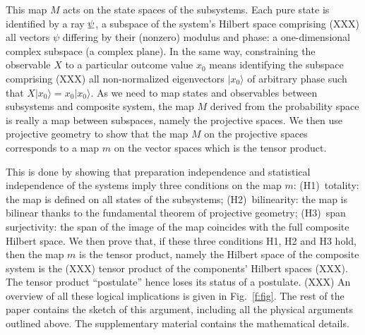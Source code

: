 \documentclass[aps,prl,amsmath,amssymb,twocolumn]{revtex4}
\theoremstyle{plain}
\theoremstyle{definition}
\theoremstyle{remark}
\newcommand{\pj}[1] {\underbar{$#1$}}
\def\>{\rangle}
\def\comment#1{}
\begin{document}
\comment{mettere nel supplementary: We will mainly focus on
  kine\-mati\-cal\-ly-inde\-pen\-dent systems, namely no
  superselection rules or other restrictions to the state space are
  present: it is possible to prepare each subsystem of a composite
  system in a state that is independent of the other systems
  (preparation independence).  This is the only case in which the
  tensor product can be properly employed: the Hilbert space of
  composite systems that have restrictions is {\em not} the tensor
  product of the component spaces, but a subspace of it (e.g.~the
  anti-symmetric subspace for fermions). Typically this is ignored in
  the literature, since the tensor product formalism is very
  convenient and is often used also in these cases, and superselection
  rules are typically avoidable \cite{susskind,zanardi,zanardilloyd}.
}
	
This map $M$ acts on the state spaces of the subsystems. Each pure
state is identified by a ray $\pj{\psi}$, a subspace of the system's
Hilbert space comprising (XXX) all vectors $\psi$ differing by their
(nonzero) modulus and phase: a one-dimensional complex subspace (a complex plane). In
the same way, constraining the observable $X$ to a particular outcome
value $x_0$ means identifying the subspace comprising (XXX) all
non-normalized eigenvectors $|x_0\>$ of arbitrary phase such that
$X | x_0 \> = x_0 |x_0\>$. As we need to map states and observables
between subsystems and composite system, the map $M$ derived from the
probability space is really a map between subspaces, namely the
projective spaces. We then use projective geometry to show that the
map $M$ on the projective spaces corresponds to a map $m$ on the
vector spaces which is the tensor product.

This is done by showing that preparation independence and statistical
independence of the systems imply three conditions on the map $m$:
(H1)~totality: the map is defined on all states of the subsystems;
(H2)~bilinearity: the map is bilinear thanks to the fundamental
theorem of projective geometry; (H3)~span surjectivity: the span of
the image of the map coincides with the full composite Hilbert space.  We
then prove that, if these three conditions H1, H2 and H3 hold, then
the map $m$ is the tensor product, namely the Hilbert space of the
composite system is the (XXX) tensor product of the components' Hilbert spaces (XXX). The tensor
product ``postulate'' hence loses its status of a postulate. (XXX) An
overview of all these logical implications is given in
Fig.~\ref{f:fig}. The rest of the paper contains the sketch of this
argument, including all the physical arguments outlined above. The
supplementary material contains the mathematical details.
	
\end{document}

